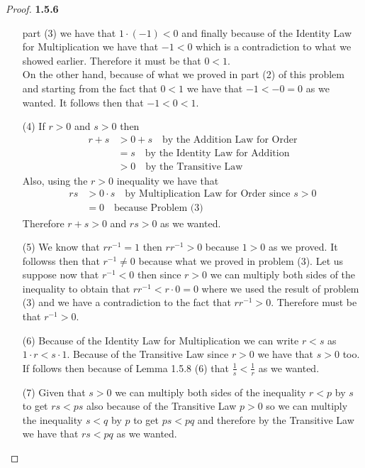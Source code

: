 \documentclass[11pt]{article}
\theoremstyle{definition}
\begin{document}
\begin{proof}{\textbf{1.5.6}}
\begin{itemize}
        part (3) we have that $1\cdot(-1)<0$ and finally because of the Identity Law for
        Multiplication we have that $-1<0$ which is a contradiction to what we showed
        earlier. Therefore it must be that $0<1$.\\
        On the other hand, because of what we proved in part (2) of this problem and
        starting from the fact that $0<1$ we have that $-1<-0=0$
        as we wanted. It follows then that $-1<0<1$.
        \item [(4)]
        If $r>0$ and $s>0$ then
        \begin{align*}
            r+s &> 0+s \quad \text{by the Addition Law for Order}\\
                &= s \quad \text{by the Identity Law for Addition}\\
                &> 0 \quad \text{by the Transitive Law}
        \end{align*}
        Also, using the $r>0$ inequality we have that
        \begin{align*}
            rs &> 0\cdot s \quad \text{by Multiplication Law for Order since }s>0\\
                &= 0 \quad \text{because Problem (3)}
        \end{align*}
        Therefore $r+s>0$ and $rs>0$ as we wanted.
        \item [(5)]
        We know that $rr^{-1}=1$ then $rr^{-1}>0$ because $1>0$ as we proved. It followss
        then that $r^{-1} \neq 0$ because what we proved in problem (3). Let us suppose
        now that $r^{-1}<0$ then since $r>0$ we can multiply both sides of the inequality
        to obtain that $rr^{-1}<r \cdot 0 = 0$ where we used the result of problem (3)
        and we have a contradiction to the fact that $rr^{-1}>0$. Therefore must be that
        $r^{-1}>0$.
        \item [(6)]
        Because of the Identity Law for Multiplication we can write $r<s$ as
        $1\cdot r<s\cdot 1$. Because of the Transitive Law since $r>0$ we have that $s>0$ too.
        If follows then because of Lemma 1.5.8 (6) that $\frac{1}{s}<\frac{1}{r}$ as we
        wanted.
        \item [(7)]
        Given that $s>0$ we can multiply both sides of the inequality $r<p$ by $s$ to get
        $rs<ps$ also because of the Transitive Law $p>0$ so we can multiply the inequality
        $s<q$ by $p$ to get $ps<pq$ and therefore by the Transitive Law we have that
        $rs<pq$ as we wanted. 
    \end{itemize}
    \end{proof}
\end{document}
